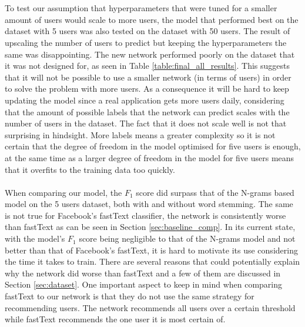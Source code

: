 \\\\
To test our assumption that hyperparameters that were tuned for a smaller amount of users would scale to more users, the model that performed best on the dataset with 5 users was also tested on the dataset with 50 users. The result of upscaling the number of users to predict but keeping the hyperparameters the same was disappointing. The new network performed poorly on the dataset that it was not designed for, as seen in Table \ref{table:final_all_results}. This suggests that it will not be possible to use a smaller network (in terms of users) in order to solve the problem with more users. As a consequence it will be hard to keep updating the model since a real application gets more users daily, considering that the amount of possible labels that the network can predict scales with the number of users in the dataset. The fact that it does not scale well is not that surprising in hindsight. More labels means a greater complexity so it is not certain that the degree of freedom in the model optimised for five users is enough, at the same time as a larger degree of freedom in the model for five users means that it overfits to the training data too quickly.
\\\\
When comparing our model, the $F_1$ score did surpass that of the N-grams based model on the 5 users dataset, both with and without word stemming. The same is not true for Facebook's fastText classifier, the network is consistently worse than fastText as can be seen in Section \ref{sec:baseline_comp}. In its current state, with the model's $F_1$ score being negligible to that of the N-grams model and not better than that of Facebook's fastText, it is hard to motivate its use considering the time it takes to train. There are several reasons that could potentially explain why the network did worse than fastText and a few of them are discussed in Section \ref{sec:dataset}. One important aspect to keep in mind when comparing fastText to our network is that they do not use the same strategy for recommending users. The network recommends all users over a certain threshold while fastText recommends the one user it is most certain of.

